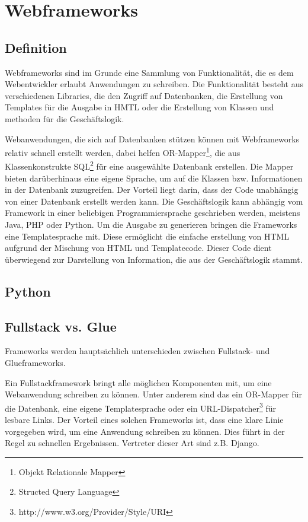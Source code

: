 \chapter{Webframeworks}
\section{Definition}
Webframeworks sind im Grunde eine Sammlung von Funktionalität, die es dem
Webentwickler erlaubt Anwendungen zu schreiben. Die Funktionalität besteht aus
verschiedenen Libraries, die den Zugriff auf Datenbanken, die Erstellung von
Templates für die Ausgabe in HMTL oder die Erstellung von Klassen und methoden
für die Geschäftslogik. 

Webanwendungen, die sich auf Datenbanken stützen können mit Webframeworks
relativ schnell erstellt werden, dabei helfen OR-Mapper\footnote{Objekt
Relationale Mapper}, die aus Klassenkonstrukte SQL\footnote{Structed Query
Language} für eine ausgewählte Datenbank erstellen. Die Mapper bieten
darüberhinaus eine eigene Sprache, um auf die Klassen bzw. Informationen in der
Datenbank zuzugreifen. Der Vorteil liegt darin, dass der Code unabhängig von
einer Datenbank erstellt werden kann. Die Geschäftslogik kann abhängig vom
Framework in einer beliebigen Programmiersprache geschrieben werden, meistens
Java, PHP oder Python. Um die Ausgabe zu generieren bringen die Frameworks eine
Templatesprache mit. Diese ermöglicht die einfache erstellung von HTML aufgrund
der Mischung von HTML und Templatecode. Dieser Code dient überwiegend zur
Darstellung von Information, die aus der Geschäftslogik stammt. 

\section{Python}

\section{Fullstack vs. Glue}
Frameworks werden hauptsächlich unterschieden zwischen Fullstack- und
Glueframeworks.

Ein Fullstackframework bringt alle möglichen Komponenten mit,
um eine Webanwendung schreiben zu können. Unter anderem sind das ein OR-Mapper
für die Datenbank, eine eigene Templatesprache oder ein
URL-Dispatcher\footnote{http://www.w3.org/Provider/Style/URI} für lesbare
Links. Der Vorteil eines solchen Frameworks ist, dass eine klare Linie 
vorgegeben wird, um eine Anwendung schreiben zu können. Dies führt in der Regel
zu schnellen Ergebnissen. Vertreter dieser Art sind z.B. Django.

